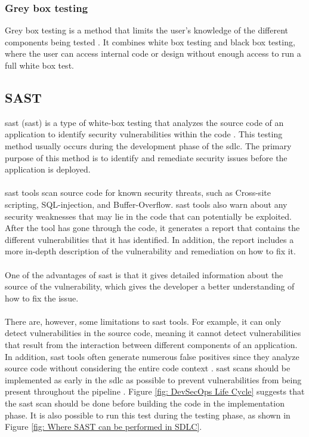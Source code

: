 \subsubsection{Grey box testing}
Grey box testing is a method that limits the user's knowledge of the different components being tested \cite{GreyBox}. It combines white box testing and black box testing, where the user can access internal code or design without enough access to run a full white box test. 

\subsection{SAST}
\acrlong{sast} (\acrshort{sast}) is a type of white-box testing that analyzes the source code of an application to identify security vulnerabilities within the code \cite{sast}. This testing method usually occurs during the development phase of the \acrlong{sdlc}. The primary purpose of this method is to identify and remediate security issues before the application is deployed. 
\\~\\
\acrshort{sast} tools scan source code for known security threats, such as \gls{Cross-site scripting}, \gls{SQL-injection}, and \gls{Buffer-Overflow}. \acrshort{sast} tools also warn about any security weaknesses that may lie in the code that can potentially be exploited. After the tool has gone through the code, it generates a report that contains the different vulnerabilities that it has identified. In addition, the report includes a more in-depth description of the vulnerability and remediation on how to fix it. 
\\~\\
One of the advantages of \acrshort{sast} is that it gives detailed information about the source of the vulnerability, which gives the developer a better understanding of how to fix the issue. 
\\~\\
There are, however, some limitations to \acrshort{sast} tools. For example, it can only detect vulnerabilities in the source code, meaning it cannot detect vulnerabilities that result from the interaction between different components of an application. In addition, \acrshort{sast} tools often generate numerous false positives since they analyze source code without considering the entire code context \cite{SastFalsePositives}.
\newpage
\acrshort{sast} scans should be implemented as early in the \acrshort{sdlc} as possible to prevent vulnerabilities from being present throughout the \gls{pipeline} \cite{SASTplacement}. Figure \ref{fig: DevSecOps Life Cycle} suggests that the \acrshort{sast} scan should be done before building the code in the implementation phase. It is also possible to run this test during the testing phase, as shown in Figure \ref{fig: Where SAST can be performed in SDLC}.

